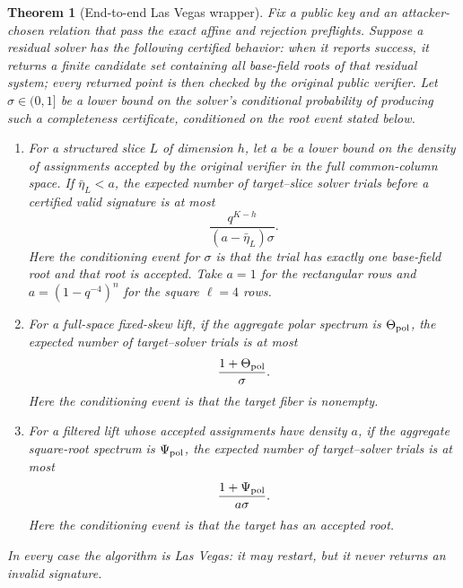 \documentclass[11pt]{article}
\newtheorem{theorem}{Theorem}
\begin{document}
\begin{theorem}[End-to-end Las Vegas wrapper]
\label{thm:las-vegas-wrapper}
Fix a public key and an attacker-chosen relation that pass the exact affine and
rejection preflights.  Suppose a residual solver has the following certified
behavior: when it reports success, it returns a finite candidate set containing
all base-field roots of that residual system; every returned point is then
checked by the original public verifier.  Let $\sigma\in(0,1]$ be a lower bound
on the solver's conditional probability of producing such a completeness
certificate, conditioned on the root event stated below.

\begin{enumerate}[label=(\alph*),itemsep=3pt]
\item For a structured slice $L$ of dimension $h$, let $a$ be a
      lower bound on the density of assignments accepted by the original
      verifier in the full common-column space.  If $\bar\eta_L<a$, the
      expected number of target--slice solver trials before a certified valid
      signature is at most
      \begin{equation}\label{eq:wrapper-structured}
        \frac{q^{K-h}}{(a-\bar\eta_L)\sigma}.
      \end{equation}
      Here the conditioning event for $\sigma$ is that the trial has exactly
      one base-field root and that root is accepted.  Take $a=1$ for the
      rectangular rows and $a=(1-q^{-4})^n$ for the square $\ell=4$ rows.
\item For a full-space fixed-skew lift, if the aggregate polar spectrum is
      $\Theta_{\rm pol}$, the expected number of target--solver trials is at
      most
      \begin{equation}\label{eq:wrapper-fixed-skew}
        \frac{1+\Theta_{\rm pol}}{\sigma}.
      \end{equation}
      Here the conditioning event is that the target fiber is nonempty.
\item For a filtered lift whose accepted assignments have density $a$, if the
      aggregate square-root spectrum is $\Psi_{\rm pol}$, the expected number
      of target--solver trials is at most
      \begin{equation}\label{eq:wrapper-filtered}
        \frac{1+\Psi_{\rm pol}}{a\sigma}.
      \end{equation}
      Here the conditioning event is that the target has an accepted root.
\end{enumerate}
In every case the algorithm is Las Vegas: it may restart, but it never returns
an invalid signature.
\end{theorem}
\end{document}
